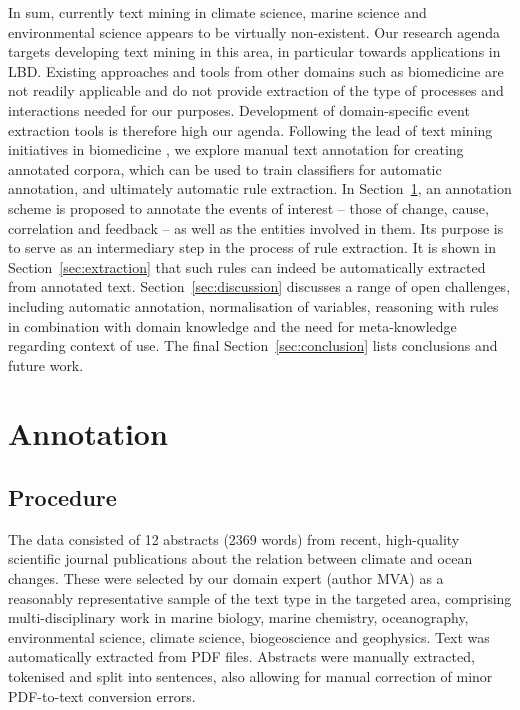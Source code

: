 \documentclass[10pt, a4paper]{article}
\begin{document}
In sum, currently text mining in climate science, marine science and environmental science appears to be virtually non-existent.
Our research agenda targets developing text mining in this area, in particular towards applications in LBD.
Existing approaches and tools from other domains such as biomedicine are not readily applicable and
do not provide extraction of the type of processes and interactions needed for our purposes.  
Development of domain-specific event extraction tools is therefore high our agenda.
Following the lead of text mining initiatives in biomedicine \cite{Kim2009Overview}, we explore manual text annotation for creating annotated corpora, which can be used to train classifiers for automatic annotation, and ultimately automatic rule extraction.
In Section~\ref{sec:annot}, an annotation scheme is proposed to annotate the events of interest --  those of change, cause, correlation and feedback -- as well as the entities involved in them.
Its purpose is to serve as an intermediary step in the process of rule extraction.
It is shown in Section~\ref{sec:extraction} that such rules can indeed be automatically extracted from annotated text.
Section~\ref{sec:discussion} discusses a range of open challenges, including automatic annotation, normalisation of variables, reasoning with rules in combination with domain knowledge and the need for meta-knowledge regarding context of use.
The final Section~\ref{sec:conclusion} lists conclusions and future work.


\section{Annotation}
\label{sec:annot}

\subsection{Procedure}

The data consisted of 12 abstracts (2369 words) from recent, high-quality scientific journal publications about the relation between climate and ocean changes. 
These were selected by our domain expert (author MVA) as a reasonably representative sample of the text type in the targeted area, comprising multi-disciplinary work in marine biology, marine chemistry, oceanography, environmental science, climate science, biogeoscience and geophysics.
Text was automatically extracted from PDF files.
Abstracts were manually extracted, tokenised and split into sentences, also allowing for manual correction of minor PDF-to-text conversion errors.
\end{document}
